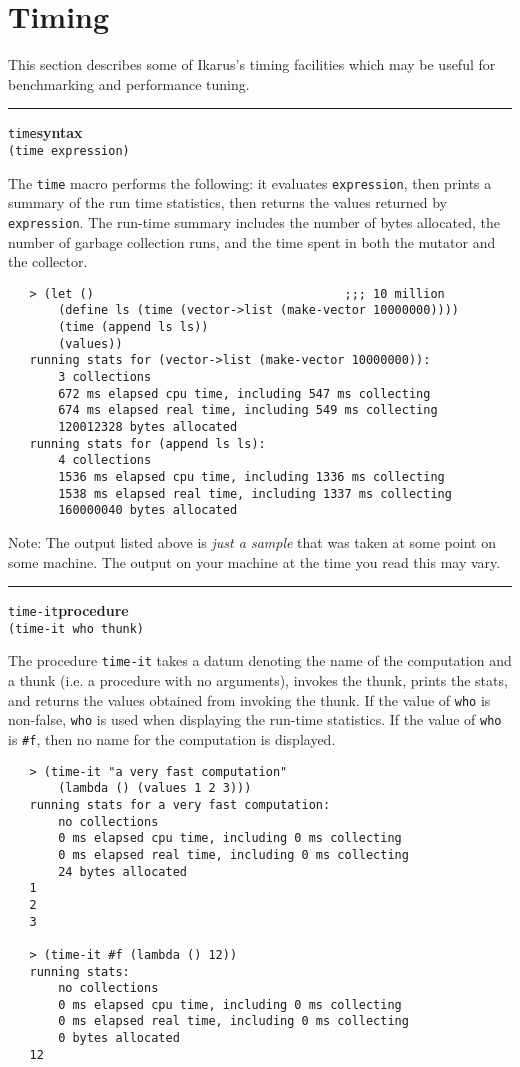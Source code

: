 \documentclass[onecolumn, 12pt, twoside, openright, dvipdfm]{book}
\makeatletter
\newcommand{\idxlabeldefun}[5]{
\vspace{1ex}
\rule{\textwidth}{2pt}
{\phantomsection\index{#1@\texttt{#2}}\label{#3}{\Large\texttt{#4}}\hfill\textbf{#5}}\\}
\newcommand{\idxdefun}[3]{\idxlabeldefun{#1}{#2}{#1}{#2}{#3}}
\newcommand{\defun}[2]{\idxdefun{#1}{#1}{#2}}
\makeatother
\begin{document}
\newpage
\section{Timing}

This section describes some of Ikarus's timing facilities which may
be useful for benchmarking and performance tuning.

\defun{time}{syntax}
\texttt{(time expression)}

The \texttt{time} macro performs the following:  it evaluates
\texttt{expression}, then prints a summary of the run time
statistics, then returns the values returned by \texttt{expression}.
The run-time summary includes the number of bytes allocated, the
number of garbage collection runs, and the time spent in both the
mutator and the collector.


\begin{verbatim}
   > (let ()                                   ;;; 10 million
       (define ls (time (vector->list (make-vector 10000000))))
       (time (append ls ls))
       (values))
   running stats for (vector->list (make-vector 10000000)):
       3 collections
       672 ms elapsed cpu time, including 547 ms collecting
       674 ms elapsed real time, including 549 ms collecting
       120012328 bytes allocated
   running stats for (append ls ls):
       4 collections
       1536 ms elapsed cpu time, including 1336 ms collecting
       1538 ms elapsed real time, including 1337 ms collecting
       160000040 bytes allocated
\end{verbatim}

Note: The  output listed above is \emph{just a sample} that was
taken at some point on some machine.  The output on your
machine at the time you read this may vary.

\newpage
\defun{time-it}{procedure}
\texttt{(time-it who thunk)}

The procedure \texttt{time-it} takes a datum denoting the name of
the computation and a thunk (i.e. a
procedure with no arguments), invokes the thunk, prints the stats,
and returns the values obtained from invoking the thunk.  
If the value of \texttt{who} is non-false, \texttt{who}
is used when displaying the run-time statistics.  If the value of
\texttt{who} is \texttt{\#f}, then no name for the computation is
displayed.

\begin{verbatim}
   > (time-it "a very fast computation"
       (lambda () (values 1 2 3)))
   running stats for a very fast computation:
       no collections
       0 ms elapsed cpu time, including 0 ms collecting
       0 ms elapsed real time, including 0 ms collecting
       24 bytes allocated
   1
   2
   3

   > (time-it #f (lambda () 12))
   running stats:
       no collections
       0 ms elapsed cpu time, including 0 ms collecting
       0 ms elapsed real time, including 0 ms collecting
       0 bytes allocated
   12
\end{verbatim}
\end{document}
